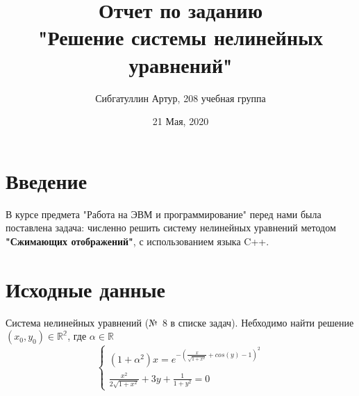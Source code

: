 \documentclass[a4paper, fontsize=14pt]{article}
\title{\textbf{Отчет по заданию \\"Решение системы нелинейных уравнений"}}
\author{Сибгатуллин Артур, 208 учебная группа}
\date{21 Мая, 2020}
\begin{document}
        \maketitle

    \newpage
        \tableofcontents

        \newpage
	\section{Введение}
	 В курсе предмета "Работа на ЭВМ и программирование" перед нами была поставлена задача: численно решить систему нелинейных уравнений методом \textbf{"Сжимающих отображений"}, с использованием языка C++.

         \section{Исходные данные}
	    Система нелинейных уравнений (№\ 8 в списке задач). Небходимо найти решение $(x_0,y_0) \in \mathbb{R^2}$, где $\alpha \in \mathbb{R}$
	\begin{equation*}
	    \begin{cases}
	        (1+\alpha^2)x = e^{-(\frac{x}{\sqrt{1+x^2}} + cos(y) -1)^2}\\
		\frac{x^2}{2\sqrt{1+x^2}} +3y + \frac{1}{1+y^2} = 0
		\end{cases}
	\end{equation*}
\end{document}
